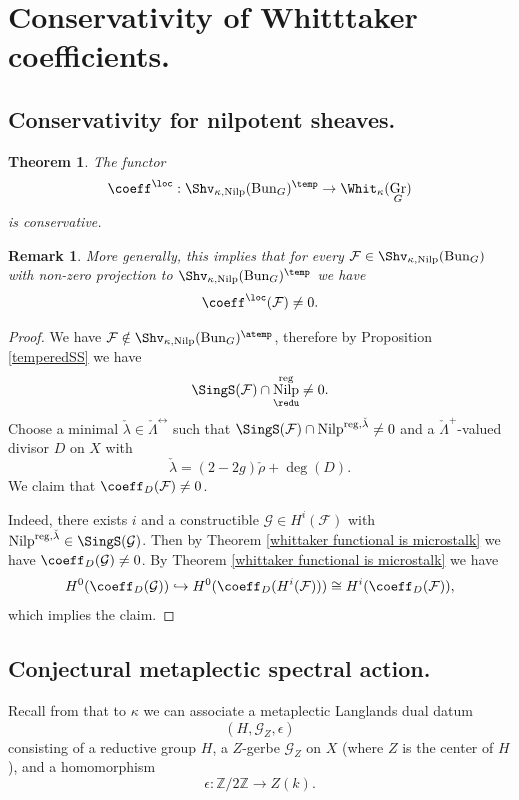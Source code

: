 \documentclass[9pt]{amsart}
\DeclareMathOperator{\Gra}{{Gr}}
\DeclareMathOperator{\reg}{{reg}}
\newcommand{\bZ}{{\mathbb Z}}
\newcommand{\cF}{{\mathcal F}}
\newcommand{\cG}{{\mathcal G}}
\newtheorem{thm}[subsubsection]{Theorem}
\DeclareMathOperator{\Nilp}{{Nilp}} \DeclareMathOperator{\op}{{op}}
\newtheorem{rem}[subsubsection]{Remark}
\numberwithin{equation}{section}
\begin{document}
\section{Conservativity of Whitttaker coefficients.}


\subsection{Conservativity for nilpotent sheaves.}

\begin{thm}\label{conservativity nilp sheaves}
	The functor $$\coeff^{\loc}: \Shv_{\kappa, \Nilp}(\Bun_{G})^{\temp} \rightarrow \Whit_{\kappa}(\Gra_G)$$ is conservative.
\end{thm}

\begin{rem}
	More generally, this implies that for every $\cF \in \Shv_{\kappa, \Nilp}(\Bun_{G})$ with non-zero projection to $ \Shv_{\kappa, \Nilp}(\Bun_{G})^{\temp}$ we have $$\coeff^{\loc}(\cF) \neq 0.$$
\end{rem}

\begin{proof}
	We have $\cF \notin \Shv_{\kappa, \Nilp}(\Bun_{G})^{\atemp}$, therefore by Proposition \ref{temperedSS} we have  $$\SingS(\cF) \cap \Nilp_{\redu}^{\reg} \neq 0.$$
	Choose a minimal $\check{\lambda} \in \check{\Lambda}^{\rel}$ such that $\SingS(\cF) \cap \Nilp^{\reg, \check{\lambda}} \neq 0$ and a $\check{\Lambda}^+$-valued divisor $D$ on $X$ with $$\check{\lambda} = (2-2g)\check{\rho} + \deg(D).$$ We claim that $\coeff_D(\cF) \neq 0$.   
	
	Indeed, there exists $i$ and a constructible $\cG \in H^i(\cF)$ with $\Nilp^{\reg, \check{\lambda}}  \in \SingS(\cG)$. Then by Theorem \ref{whittaker functional is microstalk} we have $\coeff_D(\cG) \neq 0$. By Theorem \ref{whittaker functional is microstalk} we have 
	$$H^0(\coeff_D(\cG)) \hookrightarrow H^0(\coeff_D(H^i(\cF))) \cong H^i(\coeff_D(\cF)),$$
	which implies the claim.
\end{proof}

\subsection{Conjectural metaplectic spectral action.}\label{SA}

Recall from \cite[6.3.3]{GL} that to $\kappa$ we can associate a metaplectic Langlands dual datum
$$(H, \cG_Z, \epsilon)$$
consisting of a reductive group $H$, a $Z$-gerbe  $\cG_Z$ on $X$ (where $Z$ is the center of $H$), and a homomorphism 
$$\epsilon: \bZ / 2\bZ \rightarrow Z(k).$$
\end{document}
